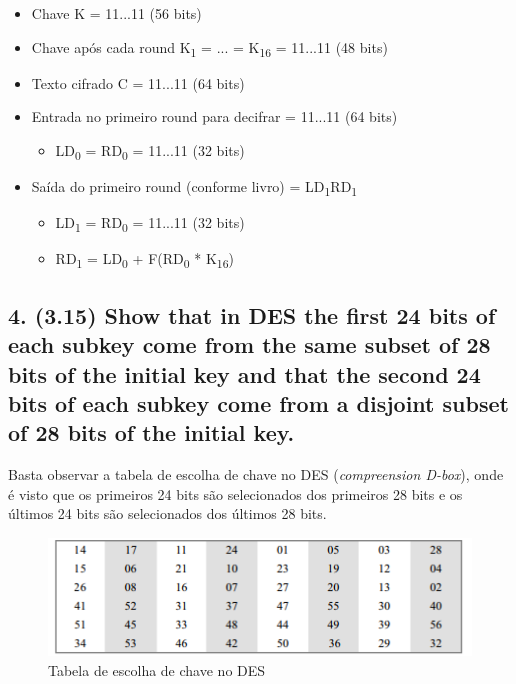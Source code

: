 \documentclass[12pt]{article}
\begin{document}
  \begin{itemize}
    \item Chave K = 11...11 (56 bits)
    \item Chave após cada round K\textsubscript{1} = ... = K\textsubscript{16} = 11...11 (48 bits)
    \item Texto cifrado C = 11...11 (64 bits)
    \item Entrada no primeiro round para decifrar = 11...11 (64 bits)
    \begin{itemize}
      \item LD\textsubscript{0} = RD\textsubscript{0} = 11...11 (32 bits)
    \end{itemize}
    \item Saída do primeiro round (conforme livro) = LD\textsubscript{1}RD\textsubscript{1}
    \begin{itemize}
      \item LD\textsubscript{1} = RD\textsubscript{0} = 11...11 (32 bits)
      \item RD\textsubscript{1} = LD\textsubscript{0} + F(RD\textsubscript{0} * K\textsubscript{16})
    \end{itemize}
  \end{itemize}

\subsection*{4. (3.15) Show that in DES the first 24 bits of each subkey come
from the same subset of 28 bits of the initial key and that the second 24 bits
of each subkey come from a disjoint subset of 28 bits of the initial key.}

  Basta observar a tabela de escolha de chave no DES (\textit{compreension D-box}), onde é visto que os primeiros 24 bits são selecionados dos primeiros 28 bits e os últimos 24 bits são selecionados dos últimos 28 bits.

  \begin{figure}[h]
    \includegraphics[width=\linewidth]{des_key_table}
    \caption{Tabela de escolha de chave no DES}
  \end{figure}
\end{document}
